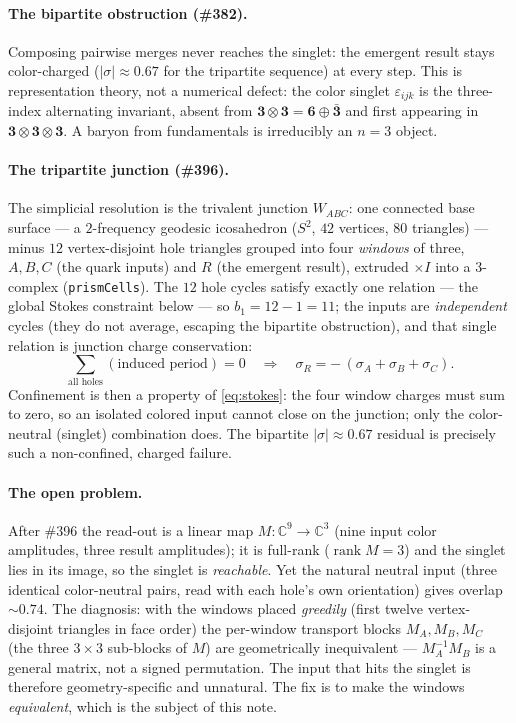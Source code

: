 \documentclass[11pt]{article}
\theoremstyle{definition}
\newcommand{\C}{\mathbb{C}}
\newcommand{\rep}[1]{\mathbf{#1}}
\newcommand{\abs}[1]{\left\lvert #1 \right\rvert}
\newcommand{\sigmacol}{\sigma}
\begin{document}
\paragraph{The bipartite obstruction (\#382).} Composing pairwise merges never
reaches the singlet: the emergent result stays color-charged
($\abs{\sigmacol}\approx 0.67$ for the tripartite sequence) at every step. This is
representation theory, not a numerical defect: the color singlet $\varepsilon_{ijk}$
is the three-index alternating invariant, absent from
$\rep{3}\otimes\rep{3}=\rep{6}\oplus\rep{\bar 3}$ and first appearing in
$\rep{3}\otimes\rep{3}\otimes\rep{3}$. A baryon from fundamentals is irreducibly an
$n=3$ object.

\paragraph{The tripartite junction (\#396).} The simplicial resolution is the
trivalent junction $W_{ABC}$: one connected base surface --- a $2$-frequency geodesic
icosahedron ($S^2$, $42$ vertices, $80$ triangles) --- minus $12$ vertex-disjoint
hole triangles grouped into four \emph{windows} of three, $A,B,C$ (the quark inputs)
and $R$ (the emergent result), extruded $\times I$ into a $3$-complex
(\texttt{prismCells}). The $12$ hole cycles satisfy exactly one relation --- the
global Stokes constraint below --- so $b_1 = 12-1 = 11$; the inputs are
\emph{independent} cycles (they do not average, escaping the bipartite obstruction),
and that single relation is junction charge conservation:
\begin{equation}
  \sum_{\text{all holes}} (\text{induced period}) = 0
  \quad\Longrightarrow\quad
  \sigmacol_R = -\,(\sigmacol_A+\sigmacol_B+\sigmacol_C).
  \label{eq:stokes}
\end{equation}
Confinement is then a property of \eqref{eq:stokes}: the four window charges must sum
to zero, so an isolated colored input cannot close on the junction; only the
color-neutral (singlet) combination does. The bipartite $\abs{\sigmacol}\approx 0.67$
residual is precisely such a non-confined, charged failure.

\paragraph{The open problem.} After \#396 the read-out is a linear map
$M:\C^9\to\C^3$ (nine input color amplitudes, three result amplitudes); it is
full-rank ($\operatorname{rank}M=3$) and the singlet lies in its image, so the
singlet is \emph{reachable}. Yet the natural neutral input (three identical
color-neutral pairs, read with each hole's own orientation) gives overlap
$\sim 0.74$. The diagnosis: with the windows placed \emph{greedily} (first twelve
vertex-disjoint triangles in face order) the per-window transport blocks
$M_A,M_B,M_C$ (the three $3\times 3$ sub-blocks of $M$) are geometrically
inequivalent --- $M_A^{-1}M_B$ is a general matrix, not a signed permutation. The
input that hits the singlet is therefore geometry-specific and unnatural. The fix is
to make the windows \emph{equivalent}, which is the subject of this note.
\end{document}
